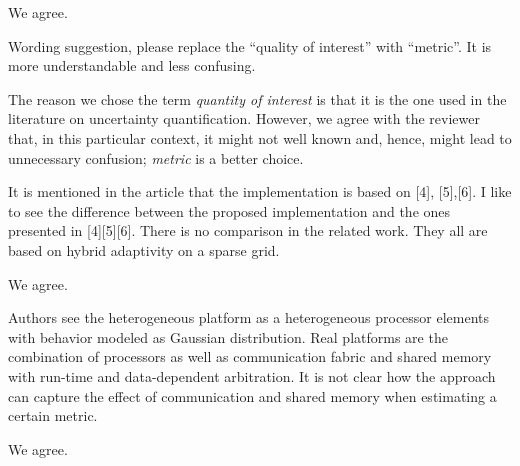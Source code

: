 \begin{authors}
We agree.

\begin{actions}
\end{actions}
\end{authors}

\begin{reviewer}
Wording suggestion, please replace the ``quality of interest'' with ``metric''.
It is more understandable and less confusing.
\end{reviewer}

\begin{authors}
The reason we chose the term \emph{quantity of interest} is that it is the one
used in the literature on uncertainty quantification. However, we agree with the
reviewer that, in this particular context, it might not well known and, hence,
might lead to unnecessary confusion; \emph{metric} is a better choice.

\begin{actions}
\end{actions}
\end{authors}

\begin{reviewer}
It is mentioned in the article that the implementation is  based on [4],
[5],[6]. I like to see the difference between the proposed implementation and
the ones presented in [4][5][6]. There is no comparison in the related work.
They all are based on hybrid adaptivity on a sparse grid.
\end{reviewer}

\begin{authors}
We agree.

\begin{actions}
\end{actions}
\end{authors}

\begin{reviewer}
Authors see the heterogeneous platform as a heterogeneous processor elements
with behavior modeled as Gaussian distribution. Real platforms are the
combination of processors as well as communication fabric and shared memory with
run-time and data-dependent arbitration. It is not clear how the approach can
capture the effect of communication and shared memory when estimating a certain
metric.
\end{reviewer}

\begin{authors}
We agree.

\begin{actions}
\end{actions}
\end{authors}
